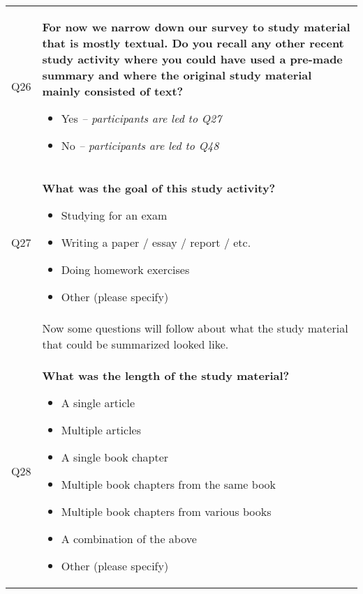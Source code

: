 \begin{xtabular}{@{\,}l <{\hskip 2pt} >{\raggedright\arraybackslash}p{0.82\textwidth}}
        \\

        Q26 & \textbf{For now we narrow down our survey to study material that is mostly textual. Do you recall any other recent study activity where you could have used a pre-made summary and where the original study material mainly consisted of text?}
        \begin{itemize}[label=$\square$, leftmargin=*, nosep]
          \item Yes \textit{-- participants are led to Q27}
          \item No \textit{-- participants are led to Q48}
        \end{itemize}

        \\

        Q27 & \textbf{What was the goal of this study activity?}
        \begin{itemize}[label=$\square$, leftmargin=*, nosep]
          \item Studying for an exam
          \item Writing a paper / essay / report / etc.
          \item Doing homework exercises
          \item Other (please specify)
        \end{itemize}

        \\

        & Now some questions will follow about what the study material that could be summarized looked like. \\

        Q28 & \textbf{What was the length of the study material?}
        \begin{itemize}[label=$\square$, leftmargin=*, nosep]
          \item A single article
          \item Multiple articles
          \item A single book chapter
          \item Multiple book chapters from the same book
          \item Multiple book chapters from various books
          \item A combination of the above
          \item Other (please specify)
        \end{itemize}

        \\


\end{xtabular}
